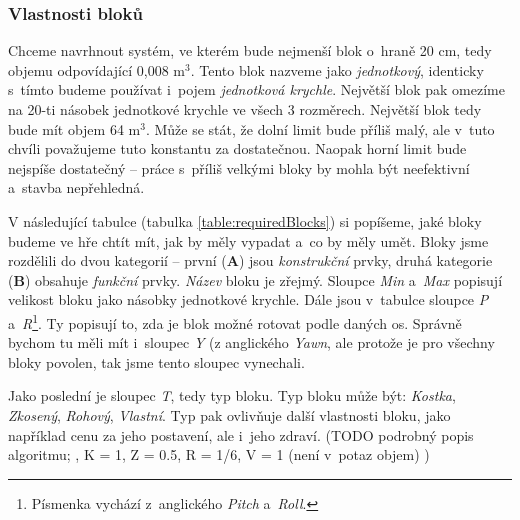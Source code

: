 \subsubsection{Vlastnosti bloků}

Chceme navrhnout systém, ve kterém bude nejmenší blok o~hraně 20 cm, tedy objemu odpovídající 0,008 m$^3$. Tento blok nazveme jako \textit{jednotkový}, identicky s~tímto budeme používat i~pojem \textit{jednotková krychle}. Největší blok pak omezíme na 20-ti násobek jednotkové krychle ve všech 3 rozměrech. Největší blok tedy bude mít objem 64 m$^3$. Může se stát, že dolní limit bude příliš malý, ale v~tuto chvíli považujeme tuto konstantu za dostatečnou. Naopak horní limit bude nejspíše dostatečný -- práce s~příliš velkými bloky by mohla být neefektivní a~stavba nepřehledná.

V následující tabulce (tabulka \ref{table:requiredBlocks}) si popíšeme, jaké bloky budeme ve hře chtít mít, jak by měly vypadat a~co by měly umět. Bloky jsme rozdělili do dvou kategorií -- první (\textbf{A}) jsou \textit{konstrukční} prvky, druhá kategorie (\textbf{B}) obsahuje \textit{funkční} prvky. \textit{Název} bloku je zřejmý. Sloupce \textit{Min} a~\textit{Max} popisují velikost bloku jako násobky jednotkové krychle. Dále jsou v~tabulce sloupce \textit{P} a~\textit{R}\footnote{Písmenka vychází z~anglického \textit{Pitch} a~\textit{Roll}. }. Ty popisují to, zda je blok možné rotovat podle daných os. Správně bychom tu měli mít i~sloupec \textit{Y} (z anglického \textit{Yawn}, ale protože je pro všechny bloky povolen, tak jsme tento sloupec vynechali. 


Jako poslední je sloupec \textit{T}, tedy typ bloku. Typ bloku může být: \textit{Kostka}, \textit{Zkosený}, \textit{Rohový}, \textit{Vlastní}. Typ pak ovlivňuje další vlastnosti bloku, jako například cenu za jeho postavení, ale i~jeho zdraví. (TODO podrobný popis algoritmu; , K = 1, Z = 0.5, R = 1/6, V = 1 (není v~potaz objem) )

